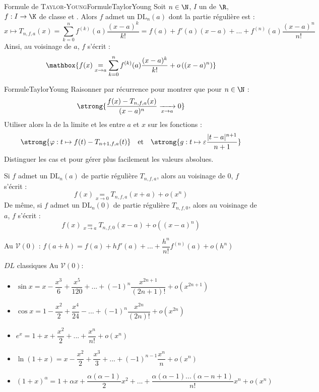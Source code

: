 \documentclass[12pt,a4paper]{report}
\begin{document}
\begin{theoreme}{Formule de \textsc{Taylor-Young}\footnotemark{}}{FormuleTaylorYoung}
    Soit $n \in \N$, $I$ un  de $\R$, $f : I \to \K$ de classe  et . Alors $f$ admet un $\mathrm{DL}_n(a)$ dont la partie régulière est :
    $$ x \mapsto T_{n,f,a} (x) = \sum_{k = 0}^n f^{(k)}(a) \dfrac{(x - a)^k}{k!} = f(a) + f'(a)(x-a) + ... + f^{(n)}(a)\dfrac{(x-a)^n}{n!} $$
    Ainsi, au voisinage de $a$, $f$ s'écrit :
    $$ \mathbox{f(x) \underset{x \to a}{=} \sum_{k = 0}^n f^{(k)}(a) \dfrac{(x - a)^k}{k!} + o\left( (x - a)^n \right)} $$
\end{theoreme}


\begin{principedemo}{FormuleTaylorYoung}
    Raisonner par récurrence pour montrer que pour $n \in \N$ :
    $$ \strong{\dfrac{f(x) - T_{n,f,a}(x)}{(x-a)^n} \xrightarrow[x \to a]{} 0} $$
    Utiliser alors la  de la limite et les  entre $a$ et $x$ sur les fonctions :
    $$ \strong{\varphi : t \mapsto f(t) - T_{n+1,f,a}(t)} \quad\text{et}\quad \strong{g : t \mapsto \varepsilon \dfrac{|t-a|^{n+1}}{n+1} } $$
    Distinguer les cas  et  pour gérer plus facilement les valeurs absolues.
\end{principedemo}

\begin{remarque}
    Si $f$ admet un $\mathrm{DL}_n(a)$ de partie régulière $T_{n,f,a}$, alors au voisinage de $0$, $f$ s'écrit :
    $$ f(x) \underset{x \to 0}{=} T_{n,f,a}(x + a) + o\left(x^n\right) $$
    De même, si $f$ admet un $\mathrm{DL}_n(0)$ de partie régulière $T_{n,f,0}$, alors au voisinage de $a$, $f$ s'écrit :
    $$ f(x) \underset{x \to a}{=} T_{n,f,0}(x - a) + o\left((x-a)^n\right) $$
\end{remarque}

Au $\mathcal{V}(0)$ : $f(a+h)=f(a)+hf'(a)+...+\dfrac{h^n}{n!} f^{(n)}(a)+o(h^n)$

\begin{proposition}{$DL$ classiques}{}
Au $\mathcal{V}(0)$:
\begin{itemize}
    \item $\sin x = x - \dfrac{x^3}{6}+\dfrac{x^5}{120}+...+(-1)^n \dfrac{x^{2n+1}}{(2n+1)!}+o(x^{2n+1})$
    \item $\cos x = 1 - \dfrac{x^2}{2}+\dfrac{x^4}{24}-...+(-1)^n \dfrac{x^{2n}}{(2n)!}+o(x^{2n})$
    \item $e^x = 1+x +\dfrac{x^2}{2}+...+ \dfrac{x^{n}}{n!}+o(x^{n})$
    \item $\ln(1+x) = x - \dfrac{x^2}{2}+\dfrac{x^3}{3}+...+ (-1)^{n-1}\dfrac{x^{n}}{n}+o(x^{n})$
    \item $(1+x)^{\alpha} = 1+ \alpha x + \dfrac{\alpha (\alpha-1)}{2} x^2+...+ \dfrac{\alpha (\alpha-1)...(\alpha-n+1)}{n!} x^n+o(x^{n})$
\end{itemize}
\end{proposition}
\end{document}
